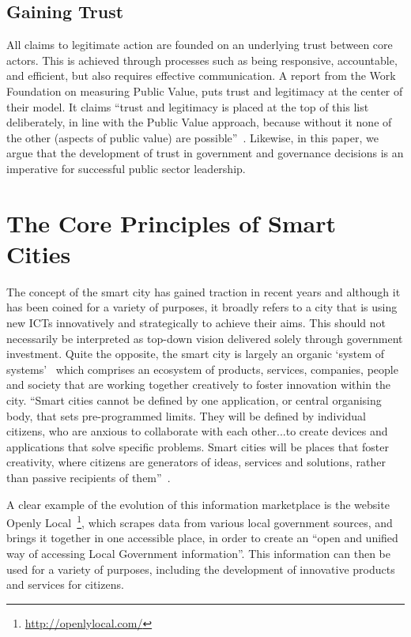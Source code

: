 \documentclass[conference]{IEEEtran}
\begin{document}
\subsection{Gaining Trust}
All claims to legitimate action are founded on an underlying trust
between core actors. This is achieved through processes such as being
responsive, accountable, and efficient, but also requires effective
communication. A report from the Work Foundation on measuring Public
Value, puts trust and legitimacy at the center of their model. It
claims ``trust and legitimacy is placed at the top of this list
deliberately, in line with the Public Value approach, because without
it none of the other (aspects of public value) are
possible''~\cite{talbot:2008}. Likewise, in this paper, we argue
that the development of trust in government and governance decisions
is an imperative for successful public sector leadership.


\section{The Core Principles of Smart Cities}
The concept of the smart city has gained traction in recent years
and although it has been coined for a variety of purposes, it broadly
refers to a city that is using new ICTs innovatively and strategically
to achieve their aims. This should not necessarily be interpreted as
top-down vision delivered solely through government investment.  Quite
the opposite, the smart city is largely an organic `system of
systems'~\cite{harrison+abbottdonnelly:2011} which comprises an
ecosystem of products, services, companies, people and society that
are working together creatively to foster innovation within the
city. ``Smart cities cannot be defined by one application, or central
organising body, that sets pre-programmed limits. They will be defined
by individual citizens, who are anxious to collaborate with each
other...to create devices and applications that solve specific
problems. Smart cities will be places that foster creativity, where
citizens are generators of ideas, services and solutions, rather than
passive recipients of them''~\cite{haque:2012}.

A clear example of the evolution of this information marketplace is
the website Openly Local~\footnote{\url{http://openlylocal.com/}},
which scrapes data from various local government sources, and brings
it together in one accessible place, in order to create an ``open and
unified way of accessing Local Government information''. This
information can then be used for a variety of purposes, including the
development of innovative products and services for citizens.
\end{document}
